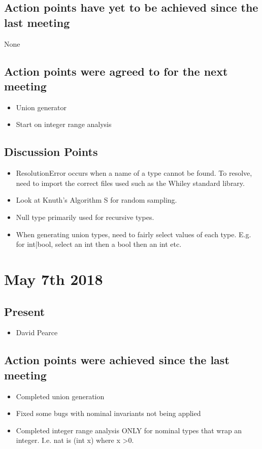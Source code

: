 \documentclass[]{article}
\begin{document}
\subsection{Action points have yet to be achieved since the last meeting}
None
\subsection{Action points were agreed to for the next meeting}
\begin{itemize}
	\item Union generator
	\item Start on integer range analysis
\end{itemize}
\subsection{Discussion Points}
\begin{itemize}
 \item ResolutionError occurs when a name of a type cannot be found. To resolve, need to import the correct files used such as the Whiley standard library.
 \item Look at Knuth's Algorithm S for random sampling.
 \item Null type primarily used for recursive types.
 \item When generating union types, need to fairly select values of each type. E.g. for int|bool, select an int then a bool then an int etc.
\end{itemize}

\section{May 7th 2018}
\subsection{Present}
\begin{itemize}
	\item David Pearce
\end{itemize}

\subsection{Action points were achieved since the last meeting}
\begin{itemize}
	\item Completed union generation
	\item Fixed some bugs with nominal invariants not being applied
	\item Completed integer range analysis ONLY for nominal types that wrap an integer. I.e. nat is (int x) where x \textgreater 0.  
\end{itemize}
\end{document}
